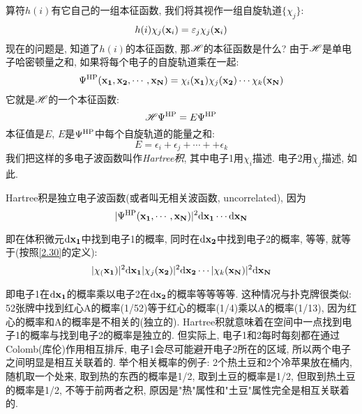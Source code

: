 算符$h(i)$有它自己的一组本征函数, 我们将其视作一组自旋轨道$\{\chi_j\}$:
\begin{equation}
\label{2.29}
h(i)\chi_j(\mathbf{x}_i)=\varepsilon_j\chi_j(\mathbf{x}_i)
\end{equation}
现在的问题是, 知道了$h(i)$的本征函数, 那$\mathscr{H}$的本征函数是什么? 由于$\mathscr{H}$是单电子哈密顿量之和, 如果将每个电子的自旋轨道乘在一起:
\begin{equation}
\label{2.30}
\Psi^{\rm HP}(\mathbf{x_1,x_2,\cdots,x_N})=\chi_i(\mathbf{x_1})\chi_j(\mathbf{x_2})\cdots\chi_k(\mathbf{x_N})
\end{equation}
它就是$\mathscr{H}$的一个本征函数:
\begin{equation}
\label{2.31}
\mathscr{H}\Psi^{\rm HP}=E\Psi^{\rm HP}
\end{equation}
本征值是$E$, $E$是$\Psi^{\rm HP}$中每个自旋轨道的能量之和:
\begin{equation}
\label{2.32}
E=\epsilon_i + \epsilon_j + \cdots + +\epsilon_k
\end{equation} 
我们把这样的多电子波函数叫作\emph{Hartree积}, 其中电子1用$\chi_i$描述. 电子2用$\chi_j$描述, 如此.


Hartree积是独立电子波函数(或者叫无相关波函数, uncorrelated), 因为
\begin{equation*}
|\Psi^{\rm HP}(\bo{x_1,\cdots,x_N})|^2\dd\bo{x_1}\cdots\dd\bo{x_N}
\end{equation*}

即在体积微元$\dd\bo{x_1}$中找到电子1的概率, 同时在$\dd\bo{x_2}$中找到电子2的概率, 等等, 就等于(按照\ref{2.30}的定义):
\begin{equation*}
|\chi_(\bo{x_1})|^2\dd\bo{x_1}|\chi_j(\bo{x_2})|^2\dd\bo{x_2}\cdots|\chi_k(\bo{x_N})|^2\dd\bo{x_N}
\end{equation*}

即电子1在$\dd\bo{x_1}$的概率乘以电子2在$\dd\bo{x_2}$的概率等等等等. 这种情况与扑克牌很类似: 52张牌中找到红心A的概率(1/52)等于红心的概率(1/4)乘以A的概率(1/13), 因为红心的概率和A的概率是不相关的(独立的). Hartree积就意味着在空间中一点找到电子1的概率与找到电子2的概率是独立的. 但实际上, 电子1和2每时每刻都在通过Colomb(库伦)作用相互排斥, 电子1会尽可能避开电子2所在的区域, 所以两个电子之间明显是相互关联着的. 举个相关概率的例子: 2个热土豆和2个冷苹果放在桶内, 随机取一个处来, 取到热的东西的概率是1/2, 取到土豆的概率是1/2, 但取到热土豆的概率是1/2, 不等于前两者之积, 原因是"热"属性和"土豆"属性完全是相互关联着的.


